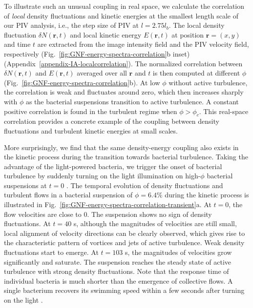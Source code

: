 \documentclass[twocolumn,aps,prx,amsmath,amssymb,longbibliography,superscriptaddress]{revtex4-2}
\begin{document}
To illustrate such an unusual coupling in real space, we calculate the correlation of \emph{local} density fluctuations and kinetic energies at the smallest length scale of our PIV analysis, i.e., the step size of PIV at $l = 2.75l_b$. The local density fluctuation $\delta N(\bm{r},t)$ and local kinetic energy $E(\bm{r},t)$ at position $\bm{r} = (x,y)$ and time $t$ are extracted from the image intensity field and the PIV velocity field, respectively (Fig.~\ref{fig:GNF-energy-spectra-correlation}b inset) (Appendix~\ref{appendix-IA-localcorrelation}).
The normalized correlation between $\delta N(\bm{r},t)$ and $E(\bm{r},t)$ averaged over all $\bm{r}$ and $t$ is then computed at different $\phi$ (Fig.~\ref{fig:GNF-energy-spectra-correlation}b). At low $\phi$ without active turbulence, the correlation is weak and fluctuates around zero, which then increases sharply with $\phi$ as the bacterial suspensions transition to active turbulence. A constant positive correlation is found in the turbulent regime when $\phi > \phi_c$. This real-space correlation provides a concrete example of the coupling between density fluctuations and turbulent kinetic energies at small scales.



More surprisingly, we find that the same density-energy coupling also exists in the kinetic process during the transition towards bacterial turbulence. Taking the advantage of the light-powered bacteria, we trigger the onset of bacterial turbulence by suddenly turning on the light illumination on high-$\phi$ bacterial suspensions at $t=0$ \cite{Peng2020}.
The temporal evolution of density fluctuations and turbulent flows in a bacterial suspension of $\phi = 6.4\%$ during the kinetic process is illustrated in Fig.~\ref{fig:GNF-energy-spectra-correlation-transient}a.
At $t=0$, the flow velocities are close to 0. The suspension shows no sign of density fluctuations. At $t=40$ s, although the magnitudes of velocities are still small, local alignment of velocity directions can be clearly observed, which gives rise to the characteristic pattern of vortices and jets of active turbulence. Weak density fluctuations start to emerge. At $t=103$ s, the magnitudes of velocities grow significantly and saturate. The suspension reaches the steady state of active turbulence with strong density fluctuations. Note that the response time of individual bacteria is much shorter than the emergence of collective flows. A single bacterium recovers its swimming speed within a few seconds after turning on the light \cite{Peng2020}.
\end{document}
